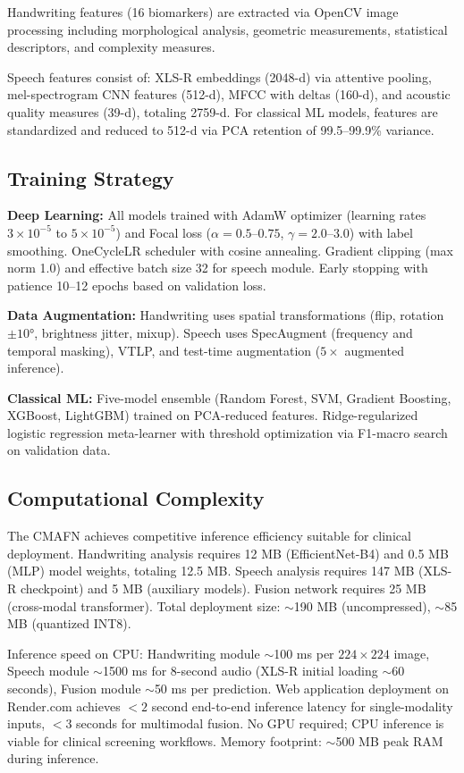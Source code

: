 \documentclass[10pt,conference,letterpaper]{IEEEtran}
\begin{document}
Handwriting features (16 biomarkers) are extracted via OpenCV image processing including morphological analysis, geometric measurements, statistical descriptors, and complexity measures.

Speech features consist of: XLS-R embeddings (2048-d) via attentive pooling, mel-spectrogram CNN features (512-d), MFCC with deltas (160-d), and acoustic quality measures (39-d), totaling 2759-d. For classical ML models, features are standardized and reduced to 512-d via PCA retention of 99.5--99.9\% variance.

\subsection{Training Strategy}

\textbf{Deep Learning:} All models trained with AdamW optimizer (learning rates $3 \times 10^{-5}$ to $5 \times 10^{-5}$) and Focal loss ($\alpha=0.5$--$0.75$, $\gamma=2.0$--$3.0$) with label smoothing. OneCycleLR scheduler with cosine annealing. Gradient clipping (max norm 1.0) and effective batch size 32 for speech module. Early stopping with patience 10--12 epochs based on validation loss.

\textbf{Data Augmentation:} Handwriting uses spatial transformations (flip, rotation $\pm 10°$, brightness jitter, mixup). Speech uses SpecAugment (frequency and temporal masking), VTLP, and test-time augmentation ($5\times$ augmented inference).

\textbf{Classical ML:} Five-model ensemble (Random Forest, SVM, Gradient Boosting, XGBoost, LightGBM) trained on PCA-reduced features. Ridge-regularized logistic regression meta-learner with threshold optimization via F1-macro search on validation data.

\subsection{Computational Complexity}

The CMAFN achieves competitive inference efficiency suitable for clinical deployment. Handwriting analysis requires 12 MB (EfficientNet-B4) and 0.5 MB (MLP) model weights, totaling 12.5 MB. Speech analysis requires 147 MB (XLS-R checkpoint) and 5 MB (auxiliary models). Fusion network requires 25 MB (cross-modal transformer). Total deployment size: $\sim$190 MB (uncompressed), $\sim$85 MB (quantized INT8).

Inference speed on CPU: Handwriting module $\sim$100 ms per $224 \times 224$ image, Speech module $\sim$1500 ms for 8-second audio (XLS-R initial loading $\sim$60 seconds), Fusion module $\sim$50 ms per prediction. Web application deployment on Render.com achieves $<2$ second end-to-end inference latency for single-modality inputs, $<3$ seconds for multimodal fusion. No GPU required; CPU inference is viable for clinical screening workflows. Memory footprint: $\sim$500 MB peak RAM during inference.
\end{document}
